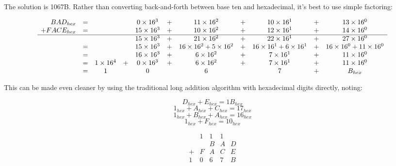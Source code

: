 

The solution is 1067B. Rather than converting back-and-forth between
base ten and hexadecimal, it's best to use simple factoring:

\begin{center}\small
\[
  \begin{array}{rcccccccccc}
  BAD_{hex} & = &&& 0\times16^3 &+& 11\times16^2 &+& 10\times16^1 &+& 13\times16^0 \\
  +FACE_{hex} & = &&& 15\times16^3 &+& 10\times16^2 &+& 12\times16^1 &+& 14\times16^0 \\\hline
              &   &&& 15\times16^3 &+& 21\times16^2 &+& 22\times16^1 &+& 27\times16^0 \\
              & = &&& 15\times16^3 &+& 16\times16^2+5\times16^2 &+& 16\times16^1+6\times16^1 &+& 16\times16^0+11\times16^0 \\
              & = &&& 16\times16^3 &+& 6\times16^2 &+& 7\times16^1 &+& 11\times16^0 \\
              & = & 1\times16^4 &+& 0\times16^3 &+& 6\times16^2 &+& 7\times16^1 &+& 11\times16^0 \\
              & = & 1 && 0 && 6 && 7 &+& B_{hex} \\
  \end{array}
\]
\end{center}

This can be made even cleaner by using the traditional long addition algorithm
with hexadecimal digits directly, noting:

\[D_{hex}+E_{hex}=1B_{hex}\]
\[1_{hex}+A_{hex}+C_{hex}=17_{hex}\]
\[1_{hex}+B_{hex}+A_{hex}=16_{hex}\]
\[1_{hex}+F_{hex}=10_{hex}\]



\begin{center}\small
\[
  \begin{array}{ccccc}
    & 1 & 1 & 1     \\
    &   & B & A & D \\
  + & F & A & C & E \\\hline
  1 & 0 & 6 & 7 & B
  \end{array}
\]
\end{center}
